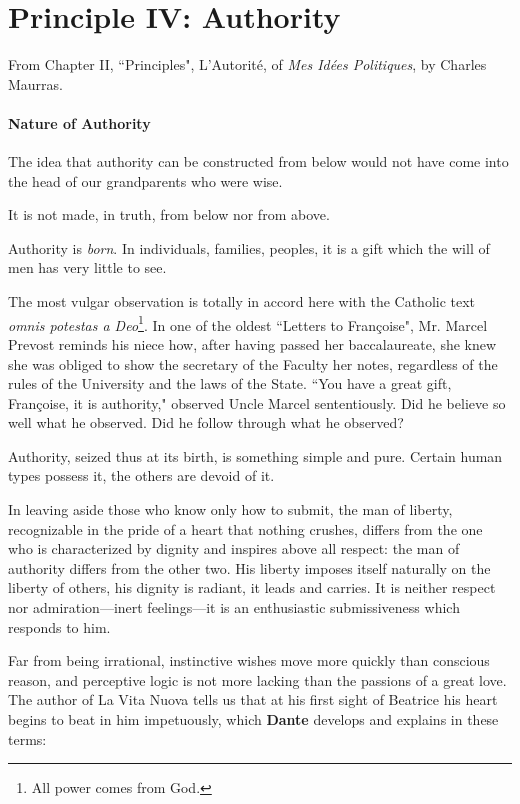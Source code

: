 \section{Principle IV: Authority}

\begin{quotex}
From Chapter II, ``Principles", L'Autorité, of \textit{Mes Idées Politiques}, by Charles Maurras.
\end{quotex}

\paragraph{Nature of Authority}
The idea that authority can be constructed from below would not have come into the head of our grandparents who were wise.

It is not made, in truth, from below nor from above.

Authority is \emph{born}. In individuals, families, peoples, it is a gift which the will of men has very little to see.

The most vulgar observation is totally in accord here with the Catholic text \emph{omnis potestas a Deo}\footnote{All power comes from God.}. In one of the oldest ``Letters to Françoise", Mr. Marcel Prevost reminds his niece how, after having passed her baccalaureate, she knew she was obliged to show the secretary of the Faculty her notes, regardless of the rules of the University and the laws of the State. ``You have a great gift, Françoise, it is authority," observed Uncle Marcel sententiously. Did he believe so well what he observed. Did he follow through what he observed?

Authority, seized thus at its birth, is something simple and pure. Certain human types possess it, the others are devoid of it.

In leaving aside those who know only how to submit, the man of liberty, recognizable in the pride of a heart that nothing crushes, differs from the one who is characterized by dignity and inspires above all respect: the man of authority differs from the other two. His liberty imposes itself naturally on the liberty of others, his dignity is radiant, it leads and carries. It is neither respect nor admiration—inert feelings—it is an enthusiastic submissiveness which responds to him.

Far from being irrational, instinctive wishes move more quickly than conscious reason, and perceptive logic is not more lacking than the passions of a great love. The author of La Vita Nuova tells us that at his first sight of Beatrice his heart begins to beat in him impetuously, which \textbf{Dante} develops and explains in these terms:

